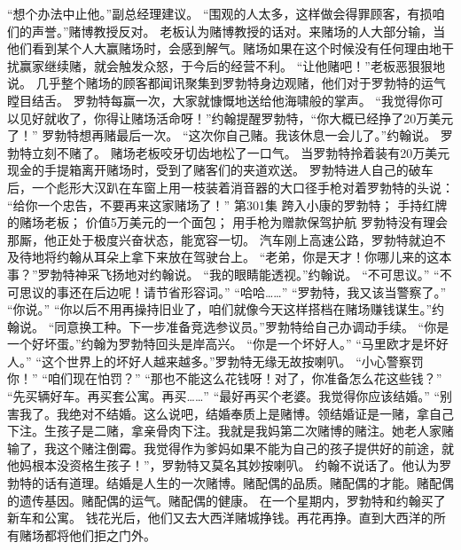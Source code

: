 \documentclass[a4paper,12pt,UTF8,twoside]{ctexbook}
\begin{document}
        “想个办法中止他。”副总经理建议。  
        “围观的人太多，这样做会得罪顾客，有损咱们的声誉。”赌博教授反对。  
        老板认为赌博教授的话对。来赌场的人大部分输，当他们看到某个人大赢赌场时，会感到解气。赌场如果在这个时候没有任何理由地干扰赢家继续赌，就会触发众怒，于今后的经营不利。  
        “让他赌吧！”老板恶狠狠地说。  
        几乎整个赌场的顾客都闻讯聚集到罗勃特身边观赌，他们对于罗勃特的运气瞠目结舌。  
        罗勃特每赢一次，大家就慷慨地送给他海啸般的掌声。  
        “我觉得你可以见好就收了，你得让赌场活命呀！”约翰提醒罗勃特，“你大概已经挣了20万美元了！”  
        罗勃特想再赌最后一次。  
        “这次你自己赌。我该休息一会儿了。”约翰说。  
        罗勃特立刻不赌了。  
        赌场老板咬牙切齿地松了一口气。  
        当罗勃特拎着装有20万美元现金的手提箱离开赌场时，受到了赌客们的夹道欢送。        
        罗勃特进人自己的破车后，一个彪形大汉趴在车窗上用一枝装着消音器的大口径手枪对着罗勃特的头说：  
      “给你一个忠告，不要再来这家赌场了！”   第301集  
        跨入小康的罗勃特；  
        手持红牌的赌场老板；  
        价值5万美元的一个面包；  
        用手枪为赠款保驾护航    
        罗勃特没有理会那厮，他正处于极度兴奋状态，能宽容一切。  
        汽车刚上高速公路，罗勃特就迫不及待地将约翰从耳朵上拿下来放在驾驶台上。  
        “老弟，你是天才！你哪儿来的这本事？”罗勃特神采飞扬地对约翰说。  
        “我的眼睛能透视。”约翰说。  
        “不可思议。”  
        “不可思议的事还在后边呢！请节省形容词。”  
        “哈哈……”  
        “罗勃特，我又该当警察了。”        
        “你说。”  
        “你以后不用再操持旧业了，咱们就像今天这样搭档在赌场赚钱谋生。”约翰说。  
        “同意换工种。下一步准备竞选参议员。”罗勃特给自己办调动手续。  
        “你是一个好坏蛋。”约翰为罗勃特回头是岸高兴。  
        “你是一个坏好人。”  
        “马里欧才是坏好人。”  
        “这个世界上的坏好人越来越多。”罗勃特无缘无故按喇叭。  
        “小心警察罚你！”  
        “咱们现在怕罚？”  
        “那也不能这么花钱呀！对了，你准备怎么花这些钱？”  
        “先买辆好车。再买套公寓。再买……”  
        “最好再买个老婆。我觉得你应该结婚。”  
        “别害我了。我绝对不结婚。这么说吧，结婚奉质上是赌博。领结婚证是一赌，拿自己下注。生孩子是二赌，拿亲骨肉下注。我就是我妈第二次赌博的赌注。她老人家赌输了，我这个赌注倒霉。我觉得作为爹妈如果不能为自己的孩子提供好的前途，就他妈根本没资格生孩子！”，罗勃特又莫名其妙按喇叭。 
        约翰不说话了。他认为罗勃特的话有道理。结婚是人生的一次赌博。赌配偶的品质。赌配偶的才能。赌配偶的遗传基因。赌配偶的运气。赌配偶的健康。  
        在一个星期内，罗勃特和约翰买了新车和公寓。  
        钱花光后，他们又去大西洋赌城挣钱。再花再挣。直到大西洋的所有赌场都将他们拒之门外。  
\end{document}
